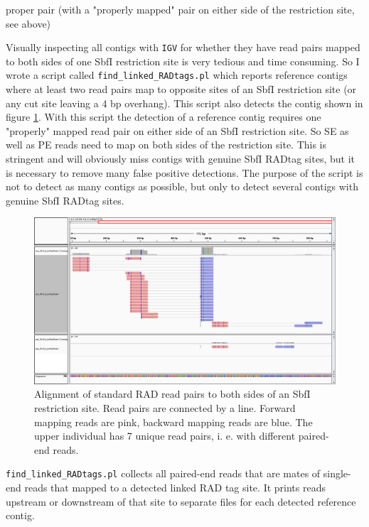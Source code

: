 \documentclass[a4paper,12pt,times,print,index, custombib]{PhDThesisPSnPDF}\usepackage[]{graphicx}\usepackage[]{color}
\begin{document}
\gls{proper pair} (with a "properly mapped" pair on either side of the restriction site, see above)

Visually inspecting all contigs with \texttt{IGV} for whether they have read pairs mapped to both sides of one SbfI restriction site is very tedious and time consuming. So I wrote a script called \texttt{find\_linked\_RADtags.pl} which reports reference contigs where at least two read pairs map to opposite sites of an SbfI restriction site (or any cut site leaving a 4 bp overhang). This script also detects the contig shown in figure \ref{LC.1628.C1.Contig1776_standRAD}. With this script the detection of a reference contig requires one "properly" mapped read pair on either side of an SbfI restriction site. So SE as well as PE reads need to map on both sides of the restriction site. This is stringent and will obviously miss contigs with genuine SbfI RADtag sites, but it is necessary to remove many false positive detections. The purpose of the script is not to detect as many contigs as possible, but only to detect several contigs with genuine SbfI RADtag sites.

\begin{figure}
\centering
\includegraphics[width=\textwidth]{igv_LC_1628_C1_Contig1776_standRAD}
\caption{Alignment of standard RAD read pairs to both sides of an SbfI restriction site. Read pairs are connected by a line. Forward mapping reads are pink, backward mapping reads are blue. The upper individual has 7 unique read pairs, i. e. with different paired-end reads.}
\label{LC.1628.C1.Contig1776_standRAD}
\end{figure}

\texttt{find\_linked\_RADtags.pl} collects all paired-end reads that are mates of single-end reads that mapped to a detected \gls{linked RAD tag site}. It prints reads upstream or downstream of that site to separate files for each detected reference contig. 
\end{document}
